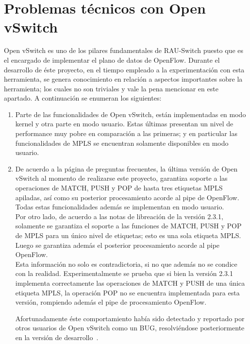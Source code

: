 \section{Problemas t\'ecnicos con Open vSwitch}
\label{apendiceB5}

Open vSwitch es uno de los pilares fundamentales de RAU-Switch puesto que es el encargado de implementar el plano de datos de OpenFlow. Durante el desarrollo de \'este proyecto, en el tiempo empleado a la experimentaci\'on con esta herramienta, se genera conocimiento en relaci\'on a aspectos importantes sobre la herramienta; los cuales no son triviales y vale la pena mencionar en este apartado. A continuaci\'on se enumeran los siguientes:\\ 

\begin{enumerate}
\item Parte de las funcionalidades de Open vSwitch, est\'an implementadas en modo kernel y otra parte en modo usuario. Estas \'ultimas presentan un nivel de performance muy pobre en comparaci\'on a las primeras; y en particular las funcionalidades de MPLS se encuentran solamente disponibles en modo usuario.

\item De acuerdo a la p\'agina de preguntas frecuentes, la \'ultima versi\'on de Open vSwitch al momento de realizarse este proyecto, garantiza soporte a las operaciones de MATCH, PUSH y POP de hasta tres etiquetas MPLS apiladas, as\'i como su posterior procesamiento acorde al pipe de OpenFlow. Todas estas funcionalidades adem\'as se implementan en modo usuario.\\

Por otro lado, de acuerdo  a las notas de libreaci\'on de la versi\'on 2.3.1, solamente se garantiza el soporte a las funciones de MATCH, PUSH y POP de MPLS para un \'unico nivel de etiquetas; esto es una sola etiqueta MPLS. Luego se garantiza adem\'as el posterior procesamiento acorde al pipe OpenFlow.\\

Esta informaci\'on no solo es contradictoria, si no que adem\'as no se condice con la realidad. Experimentalmente se prueba que si bien la versi\'on 2.3.1 implementa correctamente las operaciones de MATCH y PUSH de una \'unica etiqueta MPLS, la operaci\'on POP no se encuentra implementada para esta versi\'on, rompiendo adem\'as el pipe de procesamiento OpenFlow. 

Afortunadamente \'este comportamiento hab\'ia sido detectado y reportado por otros usuarios de Open vSwitch como un BUG, resolviéndose posteriormente en la versi\'on de desarrollo~\citep{OVSSourceCode}.


\end{enumerate}
